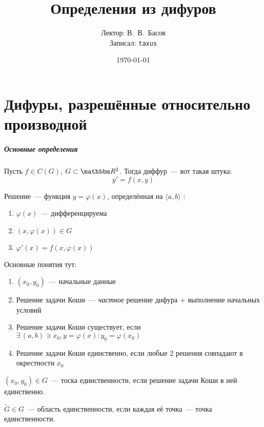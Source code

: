 \documentclass[10pt]{../notes}
\title{Определения из дифуров}
\date{\today}
\author{Лектор: В.~В.~Басов \\
        Записал: \texttt{taxus}}
\begin{document}
\maketitle

\chapter{Дифуры, разрешённые относительно производной}

\paragraph{Основные определения}

\begin{defn}\label{defn:diffeq}
  Пусть $f \in C(G)$, $G \subset \R^2$. Тогда диффур~--- вот такая штука:
  \[
    y' = f(x, y)
  \]
\end{defn}
\begin{defn}\label{defn:diffsol}
  Решение~--- функция $y=\varphi(x)$, определённая на $\langle a, b \rangle$ :
  \begin{enumerate}
    \item $\varphi(x)$~--- дифференцируема
    \item $(x, \varphi(x)) \in G$
    \item $\varphi'(x) = f(x, \varphi(x))$
  \end{enumerate}
\end{defn}

\begin{defn}\label{defn:cauchyprobl} 
  Основные понятия тут:
  \begin{enumerate}
    \item $(x_0, y_0)$~--- начальные данные
  \item Решение задачи Коши~--- \emph{частное} решение дифура + выполнение начальных условий
    \item Решение задачи Коши существует, если $\exists\, (a,b) \ni x_0,
      y=\varphi(x)\colon y_0 = \varphi(x_0)$
    \item Решение задачи Коши единственно, если любые 2 решения совпадают в окрестности
      $x_0$ 
  \end{enumerate}
\end{defn}

\begin{defn}\label{defn:uniqpnt}
  $(x_0, y_0) \in G$~--- тоска единственности, если решение задачи Коши в ней единственно.
\end{defn}
\begin{defn}\label{defn:uniqset}
  $\widetilde{G} \in G$~--- область единственности, если каждая её точка~--- точка
  единственности.
\end{defn}
\end{document}
